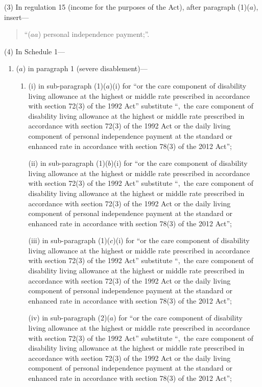 \documentclass[12pt,a4paper]{article}
\begin{document}
(3) In regulation 15 (income for the purposes of the Act), after paragraph (1)($a$), insert—
\begin{quotation}
“($aa$) personal independence payment;”.
\end{quotation}

(4) In Schedule 1—
\begin{enumerate}\item[]
($a$) in paragraph 1 (severe disablement)—
\begin{enumerate}\item[]
(i) in sub-paragraph (1)($a$)(i)  for “or the care component of disability living allowance at the highest or middle rate prescribed in accordance with section 72(3) of the 1992 Act” substitute “,~the care component of disability living allowance at the highest or middle rate prescribed in accordance with section 72(3) of the 1992 Act or the daily living component of personal independence payment at the standard or enhanced rate in accordance with section 78(3) of the 2012 Act”;

(ii) in sub-paragraph (1)($b$)(i)  for “or the care component of disability living allowance at the highest or middle rate prescribed in accordance with section 72(3) of the 1992 Act” substitute “,~the care component of disability living allowance at the highest or middle rate prescribed in accordance with section 72(3) of the 1992 Act or the daily living component of personal independence payment at the standard or enhanced rate in accordance with section 78(3) of the 2012 Act”;

(iii) in sub-paragraph (1)($c$)(i)  for “or the care component of disability living allowance at the highest or middle rate prescribed in accordance with section 72(3) of the 1992 Act” substitute “,~the care component of disability living allowance at the highest or middle rate prescribed in accordance with section 72(3) of the 1992 Act or the daily living component of personal independence payment at the standard or enhanced rate in accordance with section 78(3) of the 2012 Act”;

(iv) in sub-paragraph (2)($a$)  for “or the care component of disability living allowance at the highest or middle rate prescribed in accordance with section 72(3) of the 1992 Act” substitute “,~the care component of disability living allowance at the highest or middle rate prescribed in accordance with section 72(3) of the 1992 Act or the daily living component of personal independence payment at the standard or enhanced rate in accordance with section 78(3) of the 2012 Act”;


\end{enumerate}
\end{enumerate}
\end{document}
